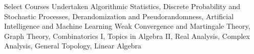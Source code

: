 
\begin{rubric}{Select Courses Undertaken}
		Algorithmic Statistics, Discrete Probability and Stochastic Processes, Derandomization and Pseudorandomness, Artificial Intelligence and Machine Learning
	\entry*[Mathematics]
		Weak Convergence and Martingale Theory, Graph Theory, Combinatorics I, Topics in Algebra II, Real Analysis, Complex Analysis, General Topology, Linear Algebra
\end{rubric}